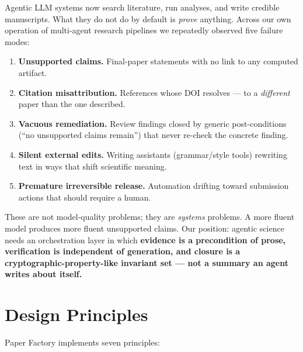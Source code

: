 \documentclass[10pt,twocolumn]{article}
\begin{document}
Agentic LLM systems now search literature, run analyses, and write credible
manuscripts. What they do not do by default is \emph{prove} anything. Across
our own operation of multi-agent research pipelines we repeatedly observed
five failure modes:

\begin{enumerate}
\item \textbf{Unsupported claims.} Final-paper statements with no link to any
computed artifact.
\item \textbf{Citation misattribution.} References whose DOI resolves --- to
a \emph{different} paper than the one described.
\item \textbf{Vacuous remediation.} Review findings closed by generic
post-conditions (``no unsupported claims remain'') that never re-check the
concrete finding.
\item \textbf{Silent external edits.} Writing assistants (grammar/style
tools) rewriting text in ways that shift scientific meaning.
\item \textbf{Premature irreversible release.} Automation drifting toward
submission actions that should require a human.
\end{enumerate}

\noindent
These are not model-quality problems; they are \emph{systems} problems. A
more fluent model produces more fluent unsupported claims. Our position:
agentic science needs an orchestration layer in which \textbf{evidence is a
precondition of prose, verification is independent of generation, and closure
is a cryptographic-property-like invariant set --- not a summary an agent
writes about itself.}

\section{Design Principles}

Paper Factory implements seven principles:
\end{document}
